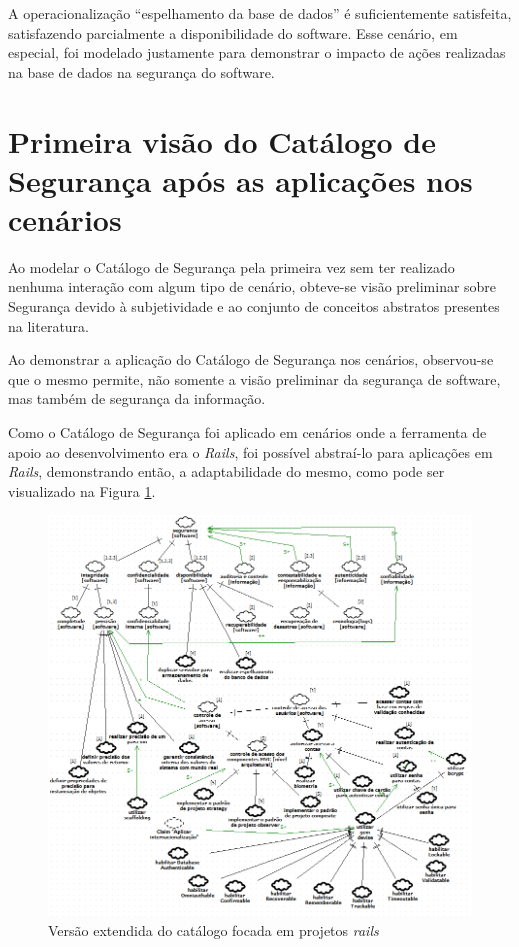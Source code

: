 A operacionalização “espelhamento da base de dados” é suficientemente satisfeita, satisfazendo parcialmente a disponibilidade do software. Esse cenário, em especial, foi modelado justamente para demonstrar o impacto de ações realizadas na base de dados na segurança do software.


\section{Primeira visão do Catálogo de Segurança após as aplicações nos cenários}
\label{sec: aplicacaoDoCatalogo}

Ao modelar o Catálogo de Segurança pela primeira vez sem ter realizado nenhuma interação com algum tipo de cenário, obteve-se visão preliminar sobre Segurança devido à subjetividade e ao conjunto de conceitos abstratos presentes na literatura.  

Ao demonstrar a aplicação do Catálogo de Segurança nos cenários, observou-se que o mesmo permite, não somente a visão preliminar da segurança de software, mas também de segurança da informação.

Como o Catálogo de Segurança foi aplicado em cenários onde a ferramenta de apoio ao desenvolvimento era o \textit{Rails}, foi possível abstraí-lo para aplicações em \textit{Rails}, demonstrando então, a adaptabilidade do mesmo, como pode ser visualizado na Figura \ref{catalogoFull}.

\begin{figure}[h!]
	\centering
	\includegraphics[keepaspectratio=true,scale=0.7]{figuras/catalogoFull.PNG}
	\caption{Versão extendida do catálogo focada em projetos \textit{rails}}
	\label{catalogoFull}
\end{figure}

